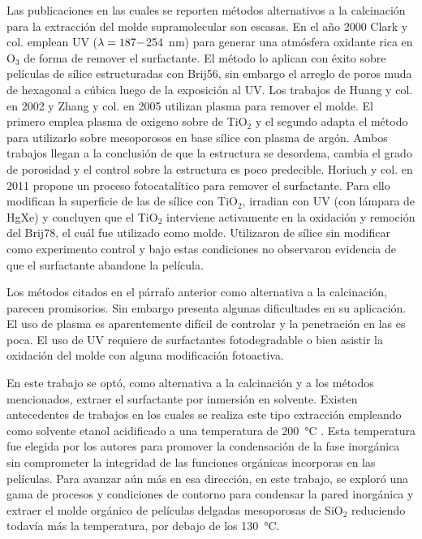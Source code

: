 	Las publicaciones en las cuales se reporten métodos alternativos a la calcinación para la extracción del molde supramolecular son escasas. En el año 2000 Clark y col.\cite{Clark2000} emplean UV ($\lambda\index{longitud de onda}=187-$\SI{254}{\nm}) para generar una atmósfera oxidante rica en O$_3$ de forma de remover el surfactante. El método lo aplican con éxito sobre películas de sílice estructuradas con Brij56, sin embargo el arreglo de poros muda de hexagonal a cúbica luego de la exposición al UV. Los trabajos de Huang y col. en 2002\cite{Huang2002} y Zhang y col. en 2005\cite{Zhang2005} utilizan plasma para remover el molde. El primero emplea plasma de oxigeno sobre \pdm\space de TiO$_2$ y el segundo adapta el método para utilizarlo sobre mesoporosos en base sílice con plasma de argón. Ambos trabajos llegan a la conclusión de que la estructura se desordena, cambia el grado de porosidad y el control sobre la estructura es poco predecible. Horiuch y col.\cite{Horiuchi2011} en 2011 propone un proceso fotocatalítico para remover el surfactante. Para ello modifican la superficie de las \pdm\space de sílice con TiO$_2$, irradian con UV (con lámpara de HgXe) y concluyen que el TiO$_2$ interviene activamente en la oxidación y remoción del Brij78, el cuál fue utilizado como molde. Utilizaron \pdm\space de sílice sin modificar como experimento control y bajo estas condiciones no observaron evidencia de que el surfactante abandone la película.

	Los métodos citados en el párrafo anterior como alternativa a la calcinación, parecen promisorios. Sin embargo presenta algunas dificultades en su aplicación. El uso de plasma es aparentemente difícil de controlar y la penetración en las \pdm\space es poca. El uso de UV requiere de surfactantes fotodegradable o bien asistir la oxidación del molde con alguna modificación fotoactiva.

	En este trabajo se optó, como alternativa a la calcinación y a los métodos mencionados, extraer el surfactante por inmersión en solvente. Existen antecedentes de trabajos en los cuales se realiza este tipo extracción empleando como solvente etanol acidificado a una temperatura de \SI{200}{\celsius} \cite{Angelome2008,Calvo20210,Calvo2010,Fuertes2009}. Esta temperatura fue elegida por los autores para promover la condensación de la fase inorgánica sin comprometer la integridad de las funciones orgánicas incorporas en las películas. Para avanzar aún más en esa dirección, en este trabajo, se exploró una gama de procesos y condiciones de contorno para condensar la pared inorgánica y extraer el molde orgánico de películas delgadas mesoporosas de SiO$_2$ reduciendo todavía más la temperatura, por debajo de los \SI{130}{\celsius}.

